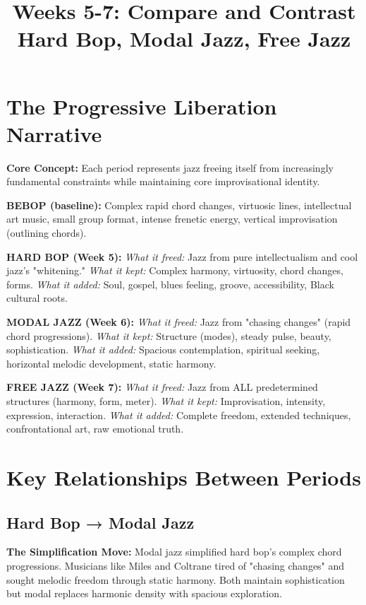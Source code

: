 \documentclass[11pt]{article}
\title{\textbf{Weeks 5-7: Compare and Contrast} \\ \large Hard Bop, Modal Jazz, Free Jazz}
\author{}
\date{}
\begin{document}
\maketitle

\section*{The Progressive Liberation Narrative}

\textbf{Core Concept:} Each period represents jazz freeing itself from increasingly fundamental constraints while maintaining core improvisational identity.

\textbf{BEBOP (baseline):} Complex rapid chord changes, virtuosic lines, intellectual art music, small group format, intense frenetic energy, vertical improvisation (outlining chords).

\textbf{HARD BOP (Week 5):} \emph{What it freed:} Jazz from pure intellectualism and cool jazz's "whitening." \emph{What it kept:} Complex harmony, virtuosity, chord changes, forms. \emph{What it added:} Soul, gospel, blues feeling, groove, accessibility, Black cultural roots.

\textbf{MODAL JAZZ (Week 6):} \emph{What it freed:} Jazz from "chasing changes" (rapid chord progressions). \emph{What it kept:} Structure (modes), steady pulse, beauty, sophistication. \emph{What it added:} Spacious contemplation, spiritual seeking, horizontal melodic development, static harmony.

\textbf{FREE JAZZ (Week 7):} \emph{What it freed:} Jazz from ALL predetermined structures (harmony, form, meter). \emph{What it kept:} Improvisation, intensity, expression, interaction. \emph{What it added:} Complete freedom, extended techniques, confrontational art, raw emotional truth.

\section*{Key Relationships Between Periods}

\subsection*{Hard Bop → Modal Jazz}
\textbf{The Simplification Move:} Modal jazz simplified hard bop's complex chord progressions. Musicians like Miles and Coltrane tired of "chasing changes" and sought melodic freedom through static harmony. Both maintain sophistication but modal replaces harmonic density with spacious exploration.
\end{document}
